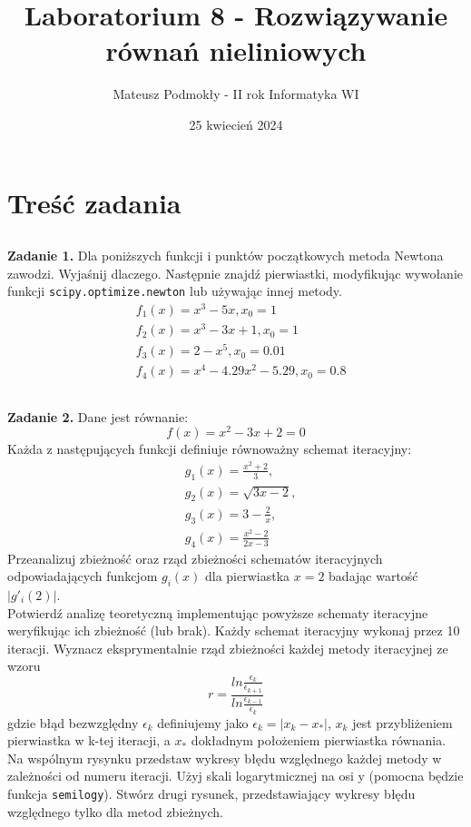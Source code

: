 \documentclass[11pt, leqno]{scrartcl}
\title{Laboratorium 8 - Rozwiązywanie równań nieliniowych}
\author{Mateusz Podmokły - II rok Informatyka WI}
\date{25 kwiecień 2024}
\begin{document}
    \maketitle
    \section{Treść zadania}
    \subsection*{}
    \textbf{Zadanie 1.}
    Dla poniższych funkcji i punktów początkowych metoda
    Newtona zawodzi. Wyjaśnij dlaczego. Następnie znajdź
    pierwiastki, modyfikując wywołanie funkcji
    \texttt{scipy.optimize.newton} lub używając innej
    metody.
    \begin{align*}
        &f_1(x)=x^3-5x,x_0=1 \\
        &f_2(x)=x^3-3x+1,x_0=1 \\
        &f_3(x)=2-x^5,x_0=0.01 \\
        &f_4(x)=x^4-4.29x^2-5.29,x_0=0.8
    \end{align*}

    \subsection*{}
    \textbf{Zadanie 2.} Dane jest równanie:
    \[
        f(x)=x^2-3x+2=0
    \]
    Każda z następujących funkcji definiuje równoważny
    schemat iteracyjny:
    \begin{align*}
        &g_1(x)=\frac{x^2+2}{3}, \\
        &g_2(x)=\sqrt{3x-2}, \\
        &g_3(x)=3-\frac{2}{x}, \\
        &g_4(x)=\frac{x^2-2}{2x-3}
    \end{align*}
    Przeanalizuj zbieżność oraz rząd zbieżności schematów
    iteracyjnych odpowiadających funkcjom $g_i(x)$ dla
    pierwiastka $x=2$ badając wartość $|g'_i(2)|$. \\
    Potwierdź analizę teoretyczną implementując powyższe
    schematy iteracyjne weryﬁkując ich zbieżność (lub brak).
    Każdy schemat iteracyjny wykonaj przez 10 iteracji.
    Wyznacz eksprymentalnie rząd zbieżności każdej metody
    iteracyjnej ze wzoru
    \[
        r=\frac{ln\frac{\epsilon_k}{\epsilon_{k+1}}}
            {ln\frac{\epsilon_{k-1}}{\epsilon_k}}
    \]
    gdzie błąd bezwzględny $\epsilon_k$ definiujemy jako
    $\epsilon_k=|x_k-x_*|$, $x_k$ jest przybliżeniem
    pierwiastka w k-tej iteracji, a $x_*$ dokładnym
    położeniem pierwiastka równania. \\
    Na wspólnym rysynku przedstaw wykresy błędu względnego
    każdej metody w zależności od numeru iteracji. Użyj
    skali logarytmicznej na osi y (pomocna będzie funkcja
    \texttt{semilogy}). Stwórz drugi rysunek, przedstawiający
    wykresy błędu względnego tylko dla metod zbieżnych.
\end{document}
